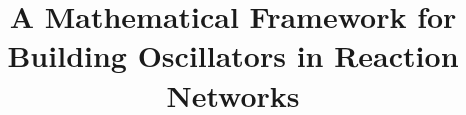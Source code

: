 \documentclass{bmcart}
\begin{document}
\begin{frontmatter}

\begin{fmbox}



\title{A Mathematical Framework for Building Oscillators in Reaction Networks}


\author[
  addressref={aff2},                   %
]{ }


\address[id=aff2]{%
  ,
  ,
  ,
}




\end{fmbox}
\end{frontmatter}
\end{document}
